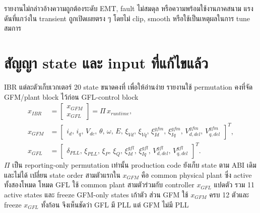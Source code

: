 \documentclass[12pt,a4paper]{article}
\begin{document}
รายงานไม่กล่าวอ้างความถูกต้องระดับ EMT, fault ไม่สมดุล หรือความพร้อมใช้งานภาคสนาม แรงดันที่แกว่งใน
transient ถูกเปิดเผยตรง ๆ โดยไม่ clip, smooth หรือใช้เป็นเหตุผลในการ tune สมการ

\section{สัญญา state และ input ที่แก้ไขแล้ว}

IBR แต่ละตัวเก็บเวกเตอร์ 20 state ขนาดคงที่ เพื่อให้อ่านง่าย รายงานใช้ permutation คงที่จัด
GFM/plant block ไว้ก่อน GFL-control block
\begin{align}
x_{IBR}&=\begin{bmatrix}x_{GFM}\\ x_{GFL}\end{bmatrix}
=\Pi\,x_{runtime},
\label{eq:xibr-th}\\[4pt]
x_{GFM}&=\begin{bmatrix}i_d,\,i_q,\,V_{dc},\,\theta,\,\omega,\,E,\,
\xi_{Vd},\,\xi_{Vq},\,\xi_{Id}^{gfm},\,\xi_{Iq}^{gfm},\,
V_{d,del}^{gfm},\,V_{q,del}^{gfm}\end{bmatrix}^{\!T},
\label{eq:xgfm-th}\\[4pt]
x_{GFL}&=\begin{bmatrix}\delta_{PLL},\,\xi_{PLL},\,\xi_P,\,\xi_Q,\,
\xi_{Id}^{gfl},\,\xi_{Iq}^{gfl},\,V_{d,del}^{gfl},\,V_{q,del}^{gfl}\end{bmatrix}^{\!T}.
\label{eq:xgfl-th}
\end{align}
$\Pi$ เป็น reporting-only permutation เท่านั้น production code ยังเก็บ state ตาม ABI เดิมและไม่ได้
เปลี่ยน state order สามตัวแรกใน $x_{GFM}$ คือ common physical plant ซึ่ง active ทั้งสองโหมด
โหมด GFL ใช้ common plant สามตัวร่วมกับ controller $x_{GFL}$ แปดตัว รวม 11 active states และ freeze
GFM-only states เก้าตัว ส่วน GFM ใช้ $x_{GFM}$ ครบ 12 ตัวและ freeze $x_{GFL}$ ทั้งก้อน จึงเห็นชัดว่า
GFL มี PLL แต่ GFM ไม่มี PLL
\end{document}
